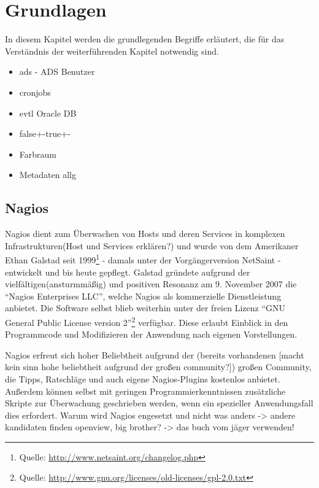 \section{Grundlagen}
In diesem Kapitel werden die grundlegenden Begriffe erläutert, die für das Verständnis der weiterführenden Kapitel notwendig sind.



\begin{center}

\begin{itemize}
\item ads - ADS Benutzer
\item cronjobs
\item evtl Oracle DB
\item false+-true+-
\item Farbraum
\item Metadaten allg
\end{itemize}

\end{center}

\subsection{Nagios}
Nagios dient zum Überwachen von Hosts und deren Services in komplexen Infrastrukturen(Host und Services erklären?) und wurde von dem Amerikaner Ethan Galstad seit 1999\footnote{Quelle: \url{http://www.netsaint.org/changelog.php}} - damals unter der Vorgängerversion NetSaint - entwickelt und bis heute gepflegt.
Galstad gründete aufgrund der vielfältigen(ansturmmäßig) und positiven Resonanz am 9. November 2007 die "`Nagios Enterprises LLC"', welche Nagios als kommerzielle Dienstleistung anbietet.
Die Software selbst blieb weiterhin unter der freien Lizenz "`GNU General Public License version 2"'\footnote{Quelle: \url{http://www.gnu.org/licenses/old-licenses/gpl-2.0.txt}} verfügbar.
Diese erlaubt Einblick in den Programmcode und Modifizieren der Anwendung nach eigenen Vorstellungen.

Nagios erfreut sich hoher Beliebtheit aufgrund der (bereits vorhandenen [macht kein sinn hohe beliebtheit aufgrund der großen community?]) großen Community, die Tipps, Ratschläge und auch eigene Nagios-Plugins kostenlos anbietet.
Außerdem können selbst mit geringen Programmierkenntnissen zusätzliche Skripte zur Überwachung geschrieben werden, wenn ein spezieller Anwendungsfall dies erfordert.
Warum wird Nagios engesetzt und nicht was anders -> andere kandidaten finden openview, big brother? -> das buch vom jäger verwenden!

